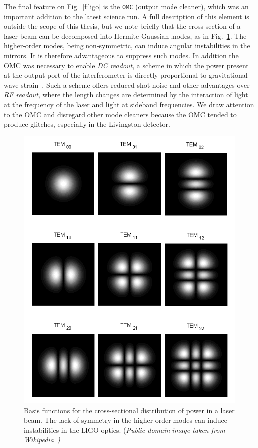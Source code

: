The final feature on Fig.~\ref{f:ligo} is the \texttt{OMC} (output
mode cleaner), which was an important addition to the latest science
run.  A full description of this element is outside the scope of this
thesis, but we note briefly that the cross-section of a laser beam can
be decomposed into Hermite-Gaussian modes, as in
Fig.~\ref{f:hermite_gauss}.  The higher-order modes, being
non-symmetric, can induce angular instabilities in the mirrors.  It is
therefore advantageous to suppress such modes.  In addition the OMC
was necessary to enable \emph{DC readout}, a scheme in which the power
present at the output port of the interferometer is directly
proportional to gravitational wave
strain~\cite{0264-9381-25-11-114030}.  Such a scheme offers reduced
shot noise and other advantages over \emph{RF readout}, where the
length changes are determined by the interaction of light at the
frequency of the laser and light at sideband frequencies.  We draw
attention to the OMC and disregard other mode cleaners because the OMC
tended to produce glitches, especially in the Livingston detector.
%
\begin{figure}
  \includegraphics[width=\linewidth]{figures/detectors/TEMmn}
  \caption[Laser modes]{
  \label{f:hermite_gauss}
Basis functions for the cross-sectional distribution of power in a
laser beam.  The lack of symmetry in the higher-order modes can induce
instabilities in the LIGO optics. (\it{Public-domain image taken from
Wikipedia}~\cite{wikipedia:temmn})
}
\end{figure}%

